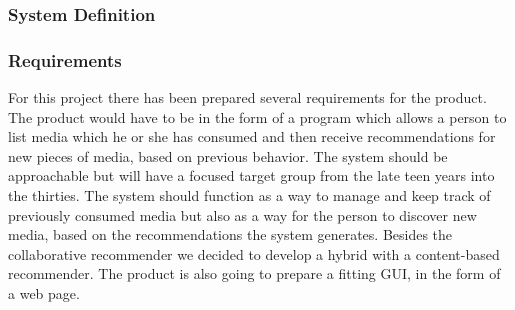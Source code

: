 \subsubsection{System Definition}
\label{SysDefinition}

\subsubsection{Requirements}

For this project there has been prepared several requirements for the product. The product would have to be in the form of a program which allows a person to list media which he or she has consumed and then receive recommendations for new pieces of media, based on previous behavior. The system should be approachable but will have a focused target group from the late teen years into the thirties. The system should function as a way to manage and keep track of previously consumed media but also as a way for the person to discover new media, based on the recommendations the system generates. Besides the collaborative recommender we decided to develop a hybrid with a content-based recommender. The product is also going to prepare a fitting GUI, in the form of a web page.

